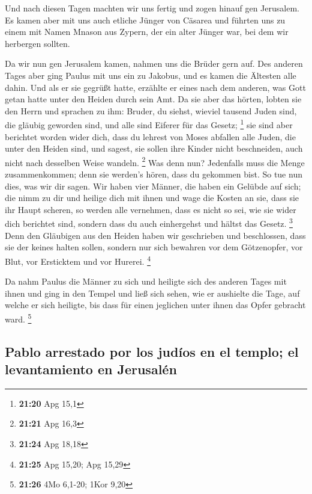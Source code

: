  Und nach diesen Tagen machten wir uns fertig und zogen
hinauf gen Jerusalem.  Es kamen aber mit uns auch etliche
Jünger von Cäsarea und führten uns zu einem mit Namen Mnason aus Zypern,
der ein alter Jünger war, bei dem wir herbergen sollten.

 Da wir nun gen Jerusalem kamen, nahmen uns die Brüder
gern auf.  Des anderen Tages aber ging Paulus mit uns ein
zu Jakobus, und es kamen die Ältesten alle dahin.  Und
als er sie gegrüßt hatte, erzählte er eines nach dem anderen, was Gott
getan hatte unter den Heiden durch sein Amt.  Da sie aber
das hörten, lobten sie den Herrn und sprachen zu ihm: Bruder, du siehst,
wieviel tausend Juden sind, die gläubig geworden sind, und alle sind
Eiferer für das Gesetz; \footnote{\textbf{21:20} Apg 15,1}
 sie sind aber berichtet worden wider dich, dass du
lehrest von Moses abfallen alle Juden, die unter den Heiden sind, und
sagest, sie sollen ihre Kinder nicht beschneiden, auch nicht nach
desselben Weise wandeln. \footnote{\textbf{21:21} Apg 16,3}
 Was denn nun? Jedenfalls muss die Menge zusammenkommen;
denn sie werden's hören, dass du gekommen bist.  So tue
nun dies, was wir dir sagen.  Wir haben vier Männer, die
haben ein Gelübde auf sich; die nimm zu dir und heilige dich mit ihnen
und wage die Kosten an sie, dass sie ihr Haupt scheren, so werden alle
vernehmen, dass es nicht so sei, wie sie wider dich berichtet sind,
sondern dass du auch einhergehst und hältst das Gesetz. \footnote{\textbf{21:24}
  Apg 18,18}  Denn den Gläubigen aus den Heiden haben wir
geschrieben und beschlossen, dass sie der keines halten sollen, sondern
nur sich bewahren vor dem Götzenopfer, vor Blut, vor Ersticktem und vor
Hurerei. \footnote{\textbf{21:25} Apg 15,20; Apg 15,29}

 Da nahm Paulus die Männer zu sich und heiligte sich des
anderen Tages mit ihnen und ging in den Tempel und ließ sich sehen, wie
er aushielte die Tage, auf welche er sich heiligte, bis dass für einen
jeglichen unter ihnen das Opfer gebracht ward. \footnote{\textbf{21:26}
  4Mo 6,1-20; 1Kor 9,20}

\hypertarget{pablo-arrestado-por-los-juduxedos-en-el-templo-el-levantamiento-en-jerusaluxe9n}{%
\subsection{Pablo arrestado por los judíos en el templo; el
levantamiento en
Jerusalén}\label{pablo-arrestado-por-los-juduxedos-en-el-templo-el-levantamiento-en-jerusaluxe9n}}

